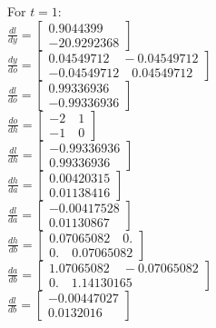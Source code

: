 \documentclass[12pt]{article}
\begin{document}
For $t=1$:\\
$\frac{dl}{dy}=\begin{bmatrix} 0.9044399 \\ -20.9292368\end{bmatrix}$\\
$\frac{dy}{do}=\begin{bmatrix} 0.04549712 \quad -0.04549712 \\
                              -0.04549712 \quad  0.04549712  \end{bmatrix}$\\
$\frac{dl}{do}=\begin{bmatrix} 0.99336936 \\ -0.99336936\end{bmatrix}$\\
$\frac{do}{dh}=\begin{bmatrix} -2 \quad 1\\
                               -1 \quad 0 \end{bmatrix}$\\
$\frac{dl}{dh}=\begin{bmatrix} -0.99336936 \\ 0.99336936\end{bmatrix}$\\
$\frac{dh}{da}=\begin{bmatrix} 0.00420315 \\ 0.01138416\end{bmatrix}$\\
$\frac{dl}{da}=\begin{bmatrix} -0.00417528 \\ 0.01130867\end{bmatrix}$\\
$\frac{dh}{db}=\begin{bmatrix} 0.07065082 \quad 0. \\
                               0. \quad 0.07065082\end{bmatrix}$\\
$\frac{da}{db}=\begin{bmatrix} 1.07065082 \quad -0.07065082\\
                               0. \quad          1.14130165 \end{bmatrix}$\\
$\frac{dl}{db}=\begin{bmatrix} -0.00447027 \\  0.0132016\end{bmatrix}$\\
\end{document}
